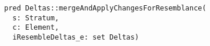 \lstset{frame=tb, aboveskip=12pt, belowskip=-3pt, breaklines=true, basicstyle=\small\ttfamily, tabsize=2, mathescape=true}
\begin{lstlisting}[caption={base\_deltas.als, lines 104-108}, label=alloy:mergeresemblance, captionpos=b]
pred Deltas::mergeAndApplyChangesForResemblance(
  s: Stratum,
  c: Element,
  iResembleDeltas_e: set Deltas)
\end{lstlisting}
